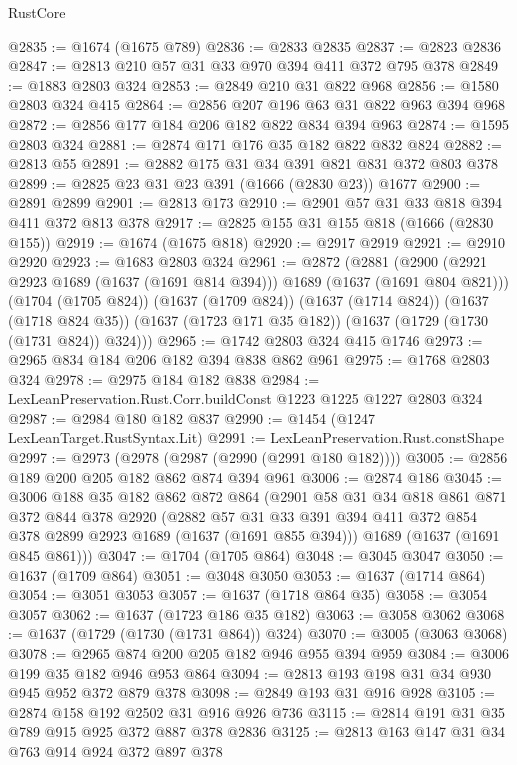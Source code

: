 \begin{lexlean}{RustCore}
\begin{coremodule}
@2835 := @1674 (@1675 @789)
@2836 := @2833 @2835
@2837 := @2823 @2836
@2847 := @2813 @210 @57 @31 @33 @970 @394 @411 @372 @795 @378
@2849 := @1883 @2803 @324
@2853 := @2849 @210 @31 @822 @968
@2856 := @1580 @2803 @324 @415
@2864 := @2856 @207 @196 @63 @31 @822 @963 @394 @968
@2872 := @2856 @177 @184 @206 @182 @822 @834 @394 @963
@2874 := @1595 @2803 @324
@2881 := @2874 @171 @176 @35 @182 @822 @832 @824
@2882 := @2813 @55
@2891 := @2882 @175 @31 @34 @391 @821 @831 @372 @803 @378
@2899 := @2825 @23 @31 @23 @391 (@1666 (@2830 @23)) @1677
@2900 := @2891 @2899
@2901 := @2813 @173
@2910 := @2901 @57 @31 @33 @818 @394 @411 @372 @813 @378
@2917 := @2825 @155 @31 @155 @818 (@1666 (@2830 @155))
@2919 := @1674 (@1675 @818)
@2920 := @2917 @2919
@2921 := @2910 @2920
@2923 := @1683 @2803 @324
@2961 := @2872
    (@2881
      (@2900 (@2921 @2923 @1689 (@1637 (@1691 @814 @394))) @1689 (@1637 (@1691 @804 @821)))
      (@1704 (@1705 @824))
      (@1637 (@1709 @824))
      (@1637 (@1714 @824))
      (@1637 (@1718 @824 @35))
      (@1637 (@1723 @171 @35 @182))
      (@1637 (@1729 (@1730 (@1731 @824)) @324)))
@2965 := @1742 @2803 @324 @415 @1746
@2973 := @2965 @834 @184 @206 @182 @394 @838 @862 @961
@2975 := @1768 @2803 @324
@2978 := @2975 @184 @182 @838
@2984 := LexLeanPreservation.Rust.Corr.buildConst @1223 @1225 @1227 @2803 @324
@2987 := @2984 @180 @182 @837
@2990 := @1454 (@1247 LexLeanTarget.RustSyntax.Lit)
@2991 := LexLeanPreservation.Rust.constShape
@2997 := @2973 (@2978 (@2987 (@2990 (@2991 @180 @182))))
@3005 := @2856 @189 @200 @205 @182 @862 @874 @394 @961
@3006 := @2874 @186
@3045 := @3006
    @188
    @35
    @182
    @862
    @872
    @864
    (@2901
      @58
      @31
      @34
      @818
      @861
      @871
      @372
      @844
      @378
      @2920
      (@2882 @57 @31 @33 @391 @394 @411 @372 @854 @378 @2899 @2923 @1689 (@1637 (@1691 @855 @394)))
      @1689
      (@1637 (@1691 @845 @861)))
@3047 := @1704 (@1705 @864)
@3048 := @3045 @3047
@3050 := @1637 (@1709 @864)
@3051 := @3048 @3050
@3053 := @1637 (@1714 @864)
@3054 := @3051 @3053
@3057 := @1637 (@1718 @864 @35)
@3058 := @3054 @3057
@3062 := @1637 (@1723 @186 @35 @182)
@3063 := @3058 @3062
@3068 := @1637 (@1729 (@1730 (@1731 @864)) @324)
@3070 := @3005 (@3063 @3068)
@3078 := @2965 @874 @200 @205 @182 @946 @955 @394 @959
@3084 := @3006 @199 @35 @182 @946 @953 @864
@3094 := @2813 @193 @198 @31 @34 @930 @945 @952 @372 @879 @378
@3098 := @2849 @193 @31 @916 @928
@3105 := @2874 @158 @192 @2502 @31 @916 @926 @736
@3115 := @2814 @191 @31 @35 @789 @915 @925 @372 @887 @378 @2836
@3125 := @2813 @163 @147 @31 @34 @763 @914 @924 @372 @897 @378

\end{coremodule}
\end{lexlean}
